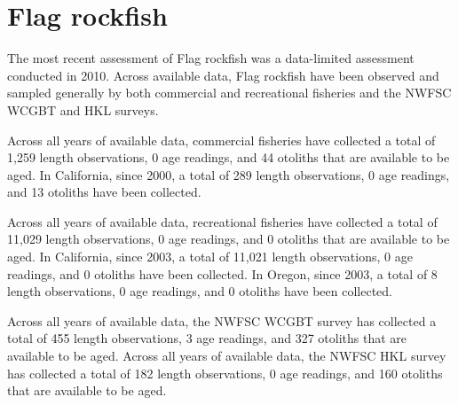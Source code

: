 \documentclass[11pt,
  english,
  letterpaper,
]{article}
\begin{document}

\hypertarget{flag-rockfish}{%
\section{Flag rockfish}\label{flag-rockfish}}

\leavevmode\tagmcend\tagstructend


The most recent assessment of Flag rockfish was a data-limited assessment conducted in 2010. Across available data, Flag rockfish have been observed and sampled generally by both commercial and recreational fisheries and the NWFSC WCGBT and HKL surveys.

\leavevmode\tagmcend\tagstructend\par


Across all years of available data, commercial fisheries have collected a total of 1,259 length observations, 0 age readings, and 44 otoliths that are available to be aged. In California, since 2000, a total of 289 length observations, 0 age readings, and 13 otoliths have been collected.

\leavevmode\tagmcend\tagstructend\par


Across all years of available data, recreational fisheries have collected a total of 11,029 length observations, 0 age readings, and 0 otoliths that are available to be aged. In California, since 2003, a total of 11,021 length observations, 0 age readings, and 0 otoliths have been collected. In Oregon, since 2003, a total of 8 length observations, 0 age readings, and 0 otoliths have been collected.

\leavevmode\tagmcend\tagstructend\par


Across all years of available data, the NWFSC WCGBT survey has collected a total of 455 length observations, 3 age readings, and 327 otoliths that are available to be aged. Across all years of available data, the NWFSC HKL survey has collected a total of 182 length observations, 0 age readings, and 160 otoliths that are available to be aged.

\leavevmode\tagmcend\tagstructend\par
\end{document}
